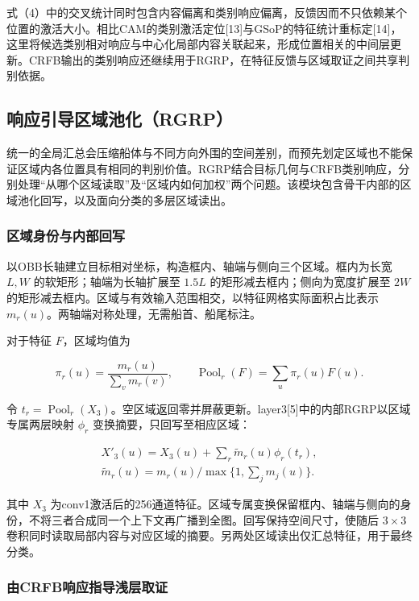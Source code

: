 \documentclass[journal,10pt,a4paper]{IEEEtran}
\begin{document}
式（4）中的交叉统计同时包含内容偏离和类别响应偏离，反馈因而不只依赖某个位置的激活大小。相比CAM的类别激活定位{[}13{]}与GSoP的特征统计重标定{[}14{]}，这里将候选类别相对响应与中心化局部内容关联起来，形成位置相关的中间层更新。CRFB输出的类别响应还继续用于RGRP，在特征反馈与区域取证之间共享判别依据。

\subsection{响应引导区域池化（RGRP）}\label{ux54cdux5e94ux5f15ux5bfcux533aux57dfux6c60ux5316rgrp}

统一的全局汇总会压缩船体与不同方向外围的空间差别，而预先划定区域也不能保证区域内各位置具有相同的判别价值。RGRP结合目标几何与CRFB类别响应，分别处理``从哪个区域读取''及``区域内如何加权''两个问题。该模块包含骨干内部的区域池化回写，以及面向分类的多层区域读出。

\subsubsection{区域身份与内部回写}\label{ux533aux57dfux8eabux4efdux4e0eux5185ux90e8ux56deux5199}

以OBB长轴建立目标相对坐标，构造框内、轴端与侧向三个区域。框内为长宽 \(L,W\) 的软矩形；轴端为长轴扩展至 \(1.5L\) 的矩形减去框内；侧向为宽度扩展至 \(2W\) 的矩形减去框内。区域与有效输入范围相交，以特征网格实际面积占比表示 \(m_r(u)\)。两轴端对称处理，无需船首、船尾标注。

对于特征 \(F\)，区域均值为

\[\pi_r(u)=\frac{m_r(u)}{\sum_v m_r(v)},\qquad \operatorname{Pool}_r(F)=\sum_u\pi_r(u)F(u).\tag{6}\]

令 \(t_r=\operatorname{Pool}_r(X_3)\)。空区域返回零并屏蔽更新。layer3{[}5{]}中的内部RGRP以区域专属两层映射 \(\phi_r\) 变换摘要，只回写至相应区域：

\[\begin{gathered}
X'_3(u)=X_3(u)+\sum_r\widetilde m_r(u)\phi_r(t_r),\\
\widetilde m_r(u)=m_r(u)/\max\{1,\sum_jm_j(u)\}.
\end{gathered}\tag{7}\]

其中 \(X_3\) 为conv1激活后的256通道特征。区域专属变换保留框内、轴端与侧向的身份，不将三者合成同一个上下文再广播到全图。回写保持空间尺寸，使随后 \(3\times3\) 卷积同时读取局部内容与对应区域的摘要。另两处区域读出仅汇总特征，用于最终分类。

\subsubsection{由CRFB响应指导浅层取证}\label{ux7531crfbux54cdux5e94ux6307ux5bfcux6d45ux5c42ux53d6ux8bc1}
\end{document}
